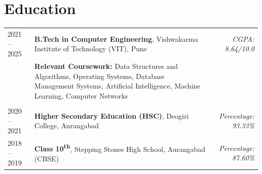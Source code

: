 \documentclass{article}
\begin{document}
\section{Education}
\begin{tabularx}{\linewidth}{@{}l X r@{}}	
2021 -- 2025 & \textbf{B.Tech in Computer Engineering}, Vishwakarma Institute of Technology (VIT), Pune & \textit{CGPA: 8.64/10.0} \\
& \textbf{Relevant Coursework:} Data Structures and Algorithms, Operating Systems, Database Management Systems, Artificial Intelligence, Machine Learning, Computer Networks & \\
\\
2020 -- 2021 & \textbf{Higher Secondary Education (HSC)}, Deogiri College, Aurangabad & \textit{Percentage: 93.33\%} \\
2018 -- 2019 & \textbf{Class 10\textsuperscript{th}}, Stepping Stones High School, Aurangabad (CBSE) & \textit{Percentage: 87.60\%} \\
\end{tabularx}


  



\end{document}
